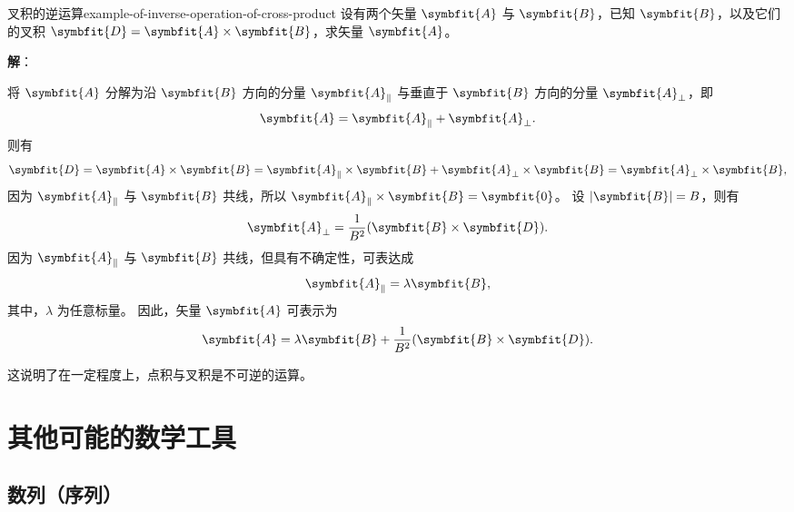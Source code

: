 \begin{example}{叉积的逆运算}{example-of-inverse-operation-of-cross-product}
    设有两个矢量 $ \symbfit{A} $ 与 $ \symbfit{B} $，已知 $ \symbfit{B} $，以及它们的叉积 $ \symbfit{D} = \symbfit{A} \times \symbfit{B} $，求矢量 $ \symbfit{A} $。

    \textbf{解}：

    将 $ \symbfit{A} $ 分解为沿 $ \symbfit{B} $ 方向的分量 $ \symbfit{A}_{\parallel} $ 与垂直于 $ \symbfit{B} $ 方向的分量 $ \symbfit{A}_{\perp} $，即
    \begin{equation}
        \symbfit{A} = \symbfit{A}_{\parallel} + \symbfit{A}_{\perp} .
    \end{equation}
    则有
    \begin{equation}
        \symbfit{D} = \symbfit{A} \times \symbfit{B} = \symbfit{A}_{\parallel} \times \symbfit{B} + \symbfit{A}_{\perp} \times \symbfit{B} = \symbfit{A}_{\perp} \times \symbfit{B} ,
    \end{equation}
    因为 $ \symbfit{A}_{\parallel} $ 与 $ \symbfit{B} $ 共线，所以 $ \symbfit{A}_{\parallel} \times \symbfit{B} = \symbfit{0} $。
    设 $ |\symbfit{B}| = B $，则有
    \begin{equation}
        \symbfit{A}_{\perp} = \frac{1}{B^2} (\symbfit{B} \times \symbfit{D}) .
    \end{equation}
    因为 $ \symbfit{A}_{\parallel} $ 与 $ \symbfit{B} $ 共线，但具有不确定性，可表达成
    \begin{equation}
        \symbfit{A}_{\parallel} = \lambda \symbfit{B} ,
    \end{equation}
    其中，$ \lambda $ 为任意标量。
    因此，矢量 $ \symbfit{A} $ 可表示为
    \begin{equation}
        \symbfit{A} = \lambda \symbfit{B} + \frac{1}{B^2} (\symbfit{B} \times \symbfit{D}) .
    \end{equation}
\end{example}

这说明了在一定程度上，点积与叉积是不可逆的运算。

\section{其他可能的数学工具}\label{sec:other-possible-mathematical-tools}

\subsection{数列（序列）}\label{subsec:sequences}

